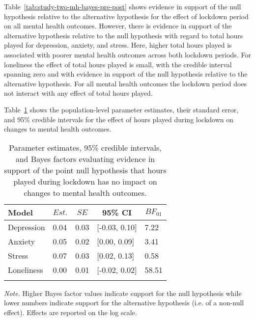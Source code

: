 \documentclass[
  english,
  man,floatsintext]{apa6}
\begin{document}
Table~\ref{tab:study-two-mh-bayes-pre-post} shows evidence in support of the null hypothesis relative to the alternative hypothesis for the effect of lockdown period on all mental health outcomes. However, there is evidence in support of the alternative hypothesis relative to the null hypothesis with regard to total hours played for depression, anxiety, and stress. Here, higher total hours played is associated with poorer mental health outcomes across both lockdown periods. For loneliness the effect of total hours played is small, with the credible interval spanning zero and with evidence in support of the null hypothesis relative to the alternative hypothesis. For all mental health outcomes the lockdown period does not interact with any effect of total hours played.

Table~\ref{tab:study-two-mh-bayes-l-diff} shows the population-level parameter estimates, their standard error, and 95\% credible intervals for the effect of hours played during lockdown on changes to mental health outcomes.

\begin{table}[!htbp]

\begin{center}
\begin{threeparttable}

\caption{\label{tab:study-two-mh-bayes-l-diff}Parameter estimates, 95\% credible intervals, and Bayes factors evaluating evidence in support of the point null hypothesis that hours played during lockdown has no impact on changes to mental health outcomes.}

\begin{tabular}{lllll}
\toprule
Model & \multicolumn{1}{c}{$Est.$} & \multicolumn{1}{c}{$SE$} & \multicolumn{1}{c}{95\% CI} & \multicolumn{1}{c}{$BF_{01}$}\\
\midrule
Depression & 0.04 & 0.03 & {}[-0.03, 0.10] & 7.22\\
Anxiety & 0.05 & 0.02 & {}[0.00, 0.09] & 3.41\\
Stress & 0.07 & 0.03 & {}[0.02, 0.13] & 0.58\\
Loneliness & 0.00 & 0.01 & {}[-0.02, 0.02] & 58.51\\
\bottomrule
\addlinespace
\end{tabular}

\begin{tablenotes}[para]
\normalsize{\textit{Note.} Higher Bayes factor values indicate support for the null hypothesis while lower numbers indicate support for the alternative hypothesis (i.e. of a non-null effect). Effects are reported on the log scale.}
\end{tablenotes}

\end{threeparttable}
\end{center}

\end{table}
\end{document}
